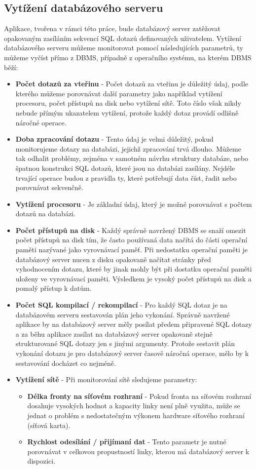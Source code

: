 \documentclass[czech,bachelor,public,dept460,male,cpdeclaration,twoside]{diploma}
\begin{document}
\subsection{Vytížení databázového serveru}
Aplikace, tvořena v rámci této práce, bude databázový server zatěžovat opakovaným zasíláním sekvencí SQL dotazů definovaných uživatelem. Vytížení databázového serveru můžeme monitorovat pomocí následujících parametrů, ty můžeme vyčíst přímo z DBMS, případně z operačního systému, na kterém DBMS běží:
\begin{itemize}
  \item \textbf{Počet dotazů za vteřinu} - Počet dotazů za vteřinu je důležitý údaj, podle kterého můžeme porovnávat další parametry jako například vytížení procesoru, počet přístupů na disk nebo vytížení sítě. Toto číslo však nikdy nebude přímým ukazatelem vytížení, protože každý dotaz provádí odlišně náročné operace.
  \item \textbf{Doba zpracování dotazu} - Tento údaj je velmi důležitý, pokud monitorujeme dotazy na databázi, jejichž zpracování trvá dlouho. Můžeme tak odhalit problémy, zejména v samotném návrhu struktury databáze, nebo špatnou konstrukci SQL dotazů, které jsou na databázi zasílány. Nejdéle trvající operace budou z pravidla ty, které potřebují data číst, řadit nebo porovnávat sekvenčně.
  \item \textbf{Vytížení procesoru} - Je základní údaj, který je možné porovnávat s počtem dotazů na databázi. 
  \item \textbf{Počet přístupů na disk} - Každý správně navržený DBMS se snaží omezit počet přístupů na disk tím, že často používaná data načítá do části operační paměti nazývané jako vyrovnávací paměť. Při nedostatku operační paměti je databázový server nucen z disku opakovaně načítat stránky před vyhodnocením dotazu, které by jinak mohly být při dostatku operační paměti uloženy ve vyrovnávací paměti. Výsledkem je vysoký počet přístupů na disk a pomalý přístup k datům.
  \item \textbf{Počet SQL kompilací / rekompilací} - Pro každý SQL dotaz je na databázovém serveru sestavován plán jeho vykonání. Správně navržené aplikace by na databázový server měly posílat předem připravené SQL dotazy a za běhu aplikace zasílat na databázový server opakovaně stejně strukturované SQL dotazy jen s jinými argumenty. Protože sestavit plán vykonání dotazu je pro databázový server časově náročná operace, mělo by k sestavování docházet co nejméně. 
  \item \textbf{Vytížení sítě} - Při monitorování sítě sledujeme parametry:
  \begin{itemize}
  	\item \textbf{Délka fronty na síťovém rozhraní} - Pokud fronta na síťovém rozhraní dosahuje vysokých hodnot a kapacity linky není plně využita, může se jednat o problém s nedostatečným výkonem hardware síťového rozhraní (síťová karta).
  	\item \textbf{Rychlost odesílání / přijímaní dat} - Tento parametr je nutné porovnávat v celkovou propustností linky, kterou má databázový server k dispozici. 
  \end{itemize}
\end{itemize}
\end{document}
